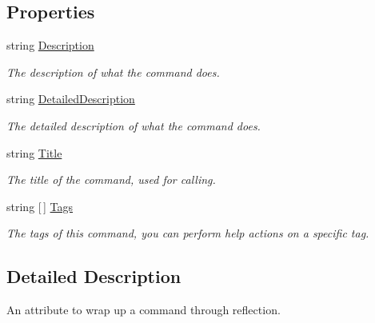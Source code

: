 \subsection*{Properties}
\begin{DoxyCompactItemize}
\item 
string \hyperlink{class_developer_console_1_1_core_1_1_command_attribute_a40403ced2d3eb10855d0a60911d6134f}{Description}
\begin{DoxyCompactList}\small\item\em The description of what the command does. \end{DoxyCompactList}\item 
string \hyperlink{class_developer_console_1_1_core_1_1_command_attribute_ae39a1615412a3f92d5128665eacae871}{Detailed\+Description}
\begin{DoxyCompactList}\small\item\em The detailed description of what the command does. \end{DoxyCompactList}\item 
string \hyperlink{class_developer_console_1_1_core_1_1_command_attribute_a52aa4f325c47ccafda6f68f45b7689b8}{Title}
\begin{DoxyCompactList}\small\item\em The title of the command, used for calling. \end{DoxyCompactList}\item 
string \mbox{[}$\,$\mbox{]} \hyperlink{class_developer_console_1_1_core_1_1_command_attribute_ab3af74c7c26ebd8c2dd83c94edf0ac9e}{Tags}
\begin{DoxyCompactList}\small\item\em The tags of this command, you can perform help actions on a specific tag. \end{DoxyCompactList}\end{DoxyCompactItemize}


\subsection{Detailed Description}
An attribute to wrap up a command through reflection. 




